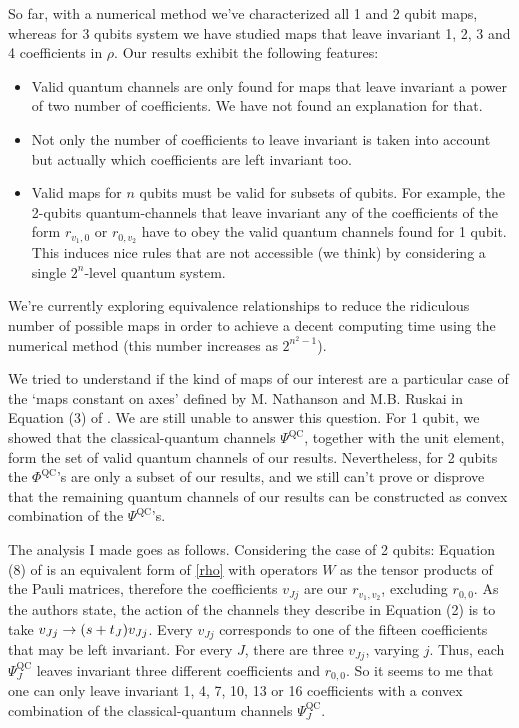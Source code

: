 \documentclass[11pt]{article}
\begin{document}
So far, with a numerical method we've characterized all 1 and 2 qubit maps, whereas 
for 3 qubits system we have studied maps that leave invariant 1, 2, 3 and 4
coefficients in $\rho$. Our results exhibit the following features:
\begin{itemize}
\item Valid quantum channels are only found for maps that leave invariant a
power of two number of coefficients. We have not found an explanation for that.
\item 
Not only the number of coefficients to leave
invariant is taken into account but actually which coefficients are left
invariant too. 
\item Valid maps for $n$ qubits must be valid for subsets of qubits. For example, 
the 2-qubits quantum-channels
that leave invariant any of the coefficients of the form $r_{v_1,0}$ or
$r_{0,v_2}$ have to obey the valid quantum channels found for 1 qubit. 
This induces nice rules that are not accessible (we think) by considering 
a single $2^n$-level quantum system.
\end{itemize}
We're currently exploring equivalence relationships to reduce the ridiculous
number of possible maps in order to achieve a decent computing time using the
numerical method (this number increases as $2^{n^2-1}$). 

We tried to understand if the kind of maps of our interest are a particular
case of the `maps constant on axes' defined by M.  Nathanson and M.B. Ruskai
in Equation (3) of \cite{nathanson2007pauli}. We are still unable to 
answer this question. 
For 1 qubit, we showed that the classical-quantum
channels $\Psi ^{\text{QC}}$, together with the unit element, form the set of
valid quantum channels of our results. Nevertheless, for 2 qubits the $\Phi
^{\text{QC}}$'s are only a subset of our results, and we still can't prove or
disprove that the remaining quantum channels of our results can be constructed
as convex combination of the $\Psi ^{\text{QC}}$'s.

The analysis I made goes as follows. Considering the case of 2 qubits: Equation (8) of \cite{nathanson2007pauli} is an
equivalent form of \eqref{rho} with operators $W$ as the tensor products of the Pauli matrices, therefore the coefficients
$v_{Jj}$ are our $r_{v_1,v_2}$, excluding $r_{0,0}$. As the authors state, the action of the channels they describe in Equation (2)
is to take $v_{Jj}\to \qty(s+t_J)v_{Jj}$. Every $v_{Jj}$ corresponds to one of the fifteen coefficients that may be left invariant.
For every $J$, there are three $v_{Jj}$, varying $j$. Thus, each $\Psi ^{\text{QC}}_J$ leaves invariant three different
coefficients and $r_{0,0}$. So it seems to me that one can only leave invariant 1, 4, 7, 10, 13 or 16 coefficients with a convex
combination of the classical-quantum channels $\Psi ^{\text{QC}}_J$.



\end{document}
